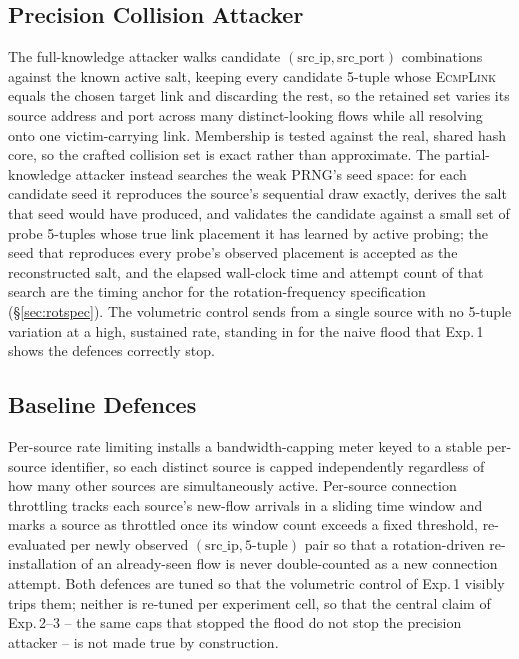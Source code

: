 \documentclass[conference]{IEEEtran}
\begin{document}
\subsection{Precision Collision Attacker}

The full-knowledge attacker walks candidate $(\mathrm{src\_ip}, \mathrm{src\_port})$ combinations against the
known active salt, keeping every candidate 5-tuple whose \textsc{EcmpLink} equals the chosen target link and
discarding the rest, so the retained set varies its source address and port across many distinct-looking flows
while all resolving onto one victim-carrying link. Membership is tested against the real, shared hash core, so
the crafted collision set is exact rather than approximate. The partial-knowledge attacker instead searches the
weak PRNG's seed space: for each candidate seed it reproduces the source's sequential draw exactly, derives the
salt that seed would have produced, and validates the candidate against a small set of probe 5-tuples whose true
link placement it has learned by active probing; the seed that reproduces every probe's observed placement is
accepted as the reconstructed salt, and the elapsed wall-clock time and attempt count of that search are the
timing anchor for the rotation-frequency specification (\S\ref{sec:rotspec}). The volumetric control sends from
a single source with no 5-tuple variation at a high, sustained rate, standing in for the naive flood that
Exp.\,1 shows the defences correctly stop.

\subsection{Baseline Defences}

Per-source rate limiting installs a bandwidth-capping meter keyed to a stable per-source identifier, so each
distinct source is capped independently regardless of how many other sources are simultaneously active.
Per-source connection throttling tracks each source's new-flow arrivals in a sliding time window and marks a
source as throttled once its window count exceeds a fixed threshold, re-evaluated per newly observed
$(\mathrm{src\_ip}, \mathrm{5\text{-}tuple})$ pair so that a rotation-driven re-installation of an already-seen
flow is never double-counted as a new connection attempt. Both defences are tuned so that the volumetric control
of Exp.\,1 visibly trips them; neither is re-tuned per experiment cell, so that the central claim of Exp.\,2--3
-- the same caps that stopped the flood do not stop the precision attacker -- is not made true by construction.
\end{document}

